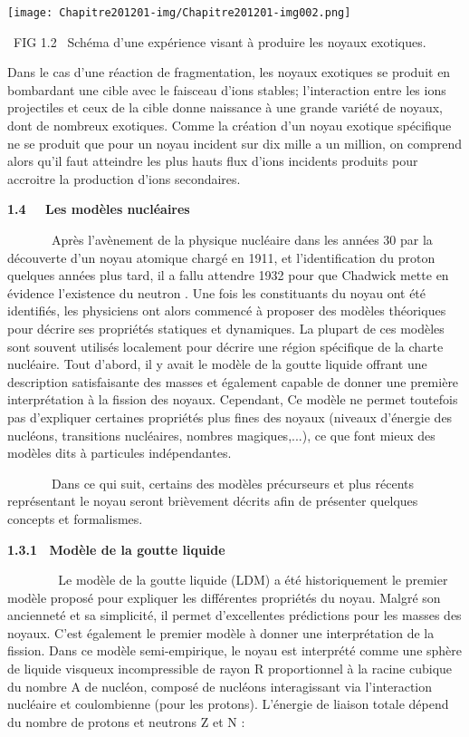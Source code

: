 \documentclass[a4paper]{article}
\begin{document}
\bigskip

 \texttt{[image: Chapitre201201-img/Chapitre201201-img002.png]} 

\ FIG 1.2 ~Schéma d'une expérience visant à produire les noyaux exotiques.

Dans le cas d’une réaction de fragmentation, les noyaux exotiques se produit en bombardant une cible avec le faisceau
d’ions stables; l'interaction entre les ions projectiles et ceux de la cible donne naissance à une grande variété de
noyaux, dont de nombreux exotiques. Comme la création d’un noyau exotique spécifique ne se produit que pour un noyau
incident sur dix mille a un million, on comprend alors qu’il faut atteindre les plus hauts flux d’ions incidents
produits pour accroitre la production d’ions secondaires.

\textbf{1.4 \ \ Les modèles nucléaires}

\ \ \ \ \ \ \ Après l’avènement de la physique nucléaire dans les années 30 par la découverte d’un noyau atomique chargé
en 1911, et l’identification du proton quelques années plus tard, il a fallu attendre 1932 pour que Chadwick mette en
évidence l’existence\textbf{ }du neutron . Une fois les constituants du noyau ont été identifiés, les physiciens ont
alors commencé à proposer des modèles théoriques pour décrire ses propriétés statiques et dynamiques. La plupart de ces
modèles sont souvent utilisés localement pour décrire une région spécifique de la charte nucléaire. Tout d’abord, il y
avait le modèle de la goutte liquide offrant une description satisfaisante des masses et également capable de donner
une première interprétation à la fission des noyaux. Cependant, Ce modèle ne permet toutefois pas d’expliquer certaines
propriétés plus fines des noyaux (niveaux d’énergie des nucléons, transitions nucléaires, nombres magiques,...), ce que
font mieux des modèles dits à particules indépendantes.

\ \ \ \ \ \ \ Dans ce qui suit, certains des modèles précurseurs et plus récents représentant le noyau seront brièvement
décrits afin de présenter quelques concepts et formalismes.

\textbf{1.3.1 \ Modèle de la goutte liquide }

\textbf{\ \ \ \ \ \ \ }Le modèle de la goutte liquide (LDM) a été historiquement le premier modèle proposé pour
expliquer les différentes propriétés du noyau. Malgré son ancienneté et sa simplicité, il permet d’excellentes
prédictions pour les masses des noyaux. C’est également le premier modèle à donner une interprétation de la fission.
Dans ce modèle semi-empirique, le noyau est interprété comme une sphère de liquide visqueux incompressible de rayon R
proportionnel à la racine cubique du nombre A de nucléon, composé de nucléons interagissant via l’interaction nucléaire
et coulombienne (pour les protons). L’énergie de liaison totale dépend du nombre de protons et neutrons Z et N :
\end{document}
